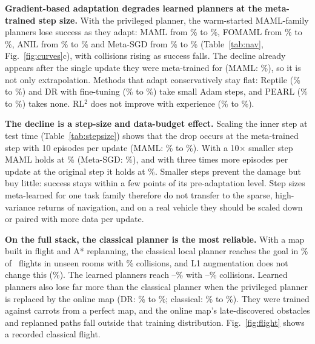 \textbf{Gradient-based adaptation degrades learned planners at the meta-trained step size.} With the privileged planner, the warm-started MAML-family planners lose success as they adapt: MAML from \valNavMamlPre\% to \valNavMamlPost\%, FOMAML from \valNavFomamlPre\% to \valNavFomamlPost\%, ANIL from \valNavAnilPre\% to \valNavAnilPost\% and Meta-SGD from \valNavMetasgdPre\% to \valNavMetasgdPost\% (Table~\ref{tab:nav}, Fig.~\ref{fig:curves}c), with collisions rising as success falls. The decline already appears after the single update they were meta-trained for (MAML: \valNavMamlStageOne\%), so it is not only extrapolation. Methods that adapt conservatively stay flat: Reptile (\valNavReptilePre\% to \valNavReptilePost\%) and DR with fine-tuning (\valNavDrftPre\% to \valNavDrftPost\%) take small Adam steps, and PEARL (\valNavPearlPre\% to \valNavPearlPost\%) takes none. RL$^2$ does not improve with experience (\valNavRltwoPre\% to \valNavRltwoPost\%).

\begin{table}[t]
\centering
\caption{The navigation decline is a step-size effect. Success by adaptation stage and final collision rate with the inner step scaled from its meta-trained value, or with 30 instead of 10 episodes per update. Privileged planner, 16 held-out tasks in unseen rooms, seed-0 checkpoints.}
\label{tab:stepsize}
\footnotesize

\end{table}

\textbf{The decline is a step-size and data-budget effect.} Scaling the inner step at test time (Table~\ref{tab:stepsize}) shows that the drop occurs at the meta-trained step with 10 episodes per update (MAML: \valStepMamlOnePre\% to \valStepMamlOnePost\%). With a 10$\times$ smaller step MAML holds at \valStepMamlTenthPost\% (Meta-SGD: \valStepMetasgdTenthPost\%), and with three times more episodes per update at the original step it holds at \valStepMamlDataPost\%. Smaller steps prevent the damage but buy little: success stays within a few points of its pre-adaptation level. Step sizes meta-learned for one task family therefore do not transfer to the sparse, high-variance returns of navigation, and on a real vehicle they should be scaled down or paired with more data per update.

\textbf{On the full stack, the classical planner is the most reliable.} With a map built in flight and A* replanning, the classical local planner reaches the goal in \valNavClassicalFullPost\% of \valNavFullFlights\ flights in unseen rooms with \valNavClassicalFullColl\% collisions, and L1 augmentation does not change this (\valNavClassicalloneFullPost\%). The learned planners reach \valNavFullLearnedLo--\valNavFullLearnedHi\% with \valNavFullCollLo--\valNavFullCollHi\% collisions. Learned planners also lose far more than the classical planner when the privileged planner is replaced by the online map (DR: \valNavDrPre\% to \valNavDrFullPost\%; classical: \valNavClassicalPre\% to \valNavClassicalFullPost\%). They were trained against carrots from a perfect map, and the online map's late-discovered obstacles and replanned paths fall outside that training distribution. Fig.~\ref{fig:flight} shows a recorded classical flight.

